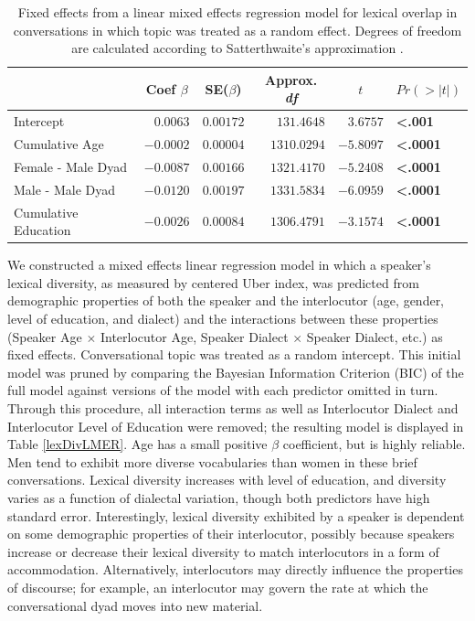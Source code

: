 \documentclass[10pt,letterpaper]{article}
\begin{document}
\begin{table}[b]
\centering
\begin{tabular}{lrrrrl}
\toprule
\multicolumn{1}{l}{}&\multicolumn{1}{c}{Coef $\beta$}&\multicolumn{1}{c}{SE($\beta$)}&\multicolumn{1}{c}{Approx. \textit{df}}&\multicolumn{1}{c}{$t$}&\multicolumn{1}{c}{$Pr(>|t|)$}\tabularnewline
\midrule
Intercept&$ 0.0063$&$0.00172$&$ 131.4648$&$ 3.6757$&\textbf{\textless .001}\tabularnewline
Cumulative Age&$-0.0002$&$0.00004$&$1310.0294$&$-5.8097$&\textbf{\textless .0001}\tabularnewline
Female - Male Dyad&$-0.0087$&$0.00166$&$1321.4170$&$-5.2408$&\textbf{\textless .0001}\tabularnewline
Male - Male Dyad&$-0.0120$&$0.00197$&$1331.5834$&$-6.0959$&\textbf{\textless .0001}\tabularnewline
Cumulative Education&$-0.0026$&$0.00084$&$1306.4791$&$-3.1574$&\textbf{\textless .0001}\tabularnewline
\bottomrule
\end{tabular}
\caption{Fixed effects from a linear mixed effects regression model for lexical overlap in conversations in which topic was treated as a random effect.  Degrees of freedom are calculated according to Satterthwaite's approximation \citep{satterthwaite1946}.}
\label{propSharedLMER}
\end{table}

We constructed a mixed effects linear regression model in which a speaker's lexical diversity, as measured by centered Uber index, was predicted from demographic properties of both the speaker and the interlocutor (age, gender, level of education, and dialect) and the interactions between these properties (Speaker Age $\times$ Interlocutor Age, Speaker Dialect $\times$ Speaker Dialect, etc.) as fixed effects. Conversational topic was treated as a random intercept. This initial model was pruned by comparing the Bayesian Information Criterion (BIC) of the full model against versions of the model with each predictor omitted in turn. Through this procedure, all interaction terms as well as Interlocutor Dialect and Interlocutor Level of Education were removed; the resulting model is displayed in Table \ref{lexDivLMER}.  Age has a small positive $\beta$ coefficient, but is highly reliable. Men tend to exhibit more diverse vocabularies than women in these brief conversations. Lexical diversity increases with level of education, and diversity varies as a function of dialectal variation, though both predictors have high standard error. Interestingly, lexical diversity exhibited by a speaker is dependent on some demographic properties of their interlocutor, possibly because speakers increase or decrease their lexical diversity to match interlocutors in a form of accommodation. Alternatively, interlocutors may directly influence the properties of discourse; for example, an interlocutor may govern the rate at which the conversational dyad moves into new material.
 
\end{document}
